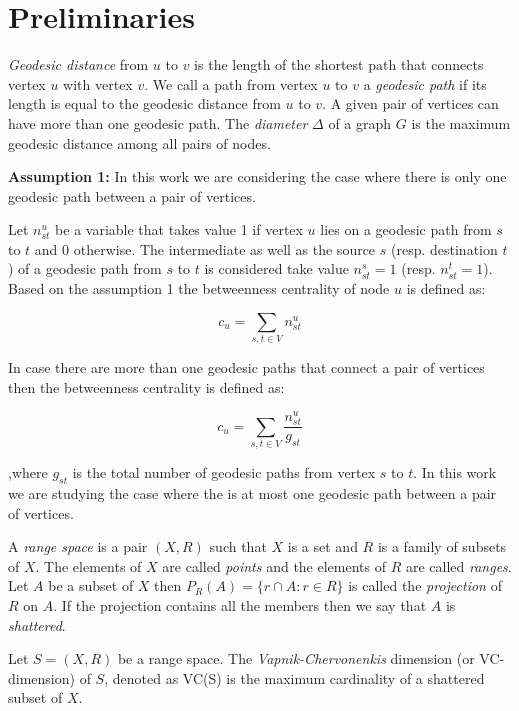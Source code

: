\section{Preliminaries}\label{sec:prelims}
\textit{Geodesic distance} from $u$ to $v$ is the length of the shortest path that connects vertex $u$ with vertex $v$.
We call a path from vertex $u$ to $v$ a \textit{geodesic path} if its length is equal to the geodesic distance from $u$ to $v$.
A given pair of vertices can have more than one geodesic path.
The \textit{diameter} $\Delta$ of a graph $G$ is the maximum geodesic distance among all pairs of nodes. 

\textbf{Assumption 1:} In this work we are considering the case where there is only one geodesic path between a pair of vertices.

Let $n_{st}^{u}$ be a variable that takes value 1 if vertex $u$ lies on a geodesic path from $s$ to $t$ and 0 otherwise.
The intermediate as well as the source $s$ (resp. destination $t$) of a geodesic path from $s$ to $t$ is considered take value $n_{st}^{s}=1$ (resp. $n_{st}^{t}=1$).
Based on the assumption 1 the betweenness centrality of node $u$ is defined as:

\begin{displaymath}
c_{u}=\sum_{s,t\in V}n_{st}^{u}
\end{displaymath}

In case there are more than one geodesic paths that connect a pair of vertices then the betweenness centrality is defined as:

\begin{displaymath}
c_{u}=\sum_{s,t\in V}\frac{n_{st}^{u}}{g_{st}}
\end{displaymath}

,where $g_{st}$ is the total number of geodesic paths from vertex $s$ to $t$.
In this work we are studying the case where the is at most one geodesic path between a pair of vertices.

A \textit{range space} is a pair $(X,R)$ such that $X$ is a set and $R$ is a family of subsets of $X$.
The elements of $X$ are called \textit{points} and the elements of $R$ are called \textit{ranges}.
Let $A$ be a subset of $X$ then $P_{R}(A)=\{r\cap A: r\in R\}$ is called the \textit{projection} of $R$ on $A$.
If the projection contains all the members then we say that $A$ is \textit{shattered}.

\begin{definition}
Let $S=(X,R)$ be a range space. The \textit{Vapnik-Chervonenkis} dimension (or VC-dimension) of $S$, denoted as VC(S) is the maximum cardinality of a shattered subset of $X$. 
\end{definition}

